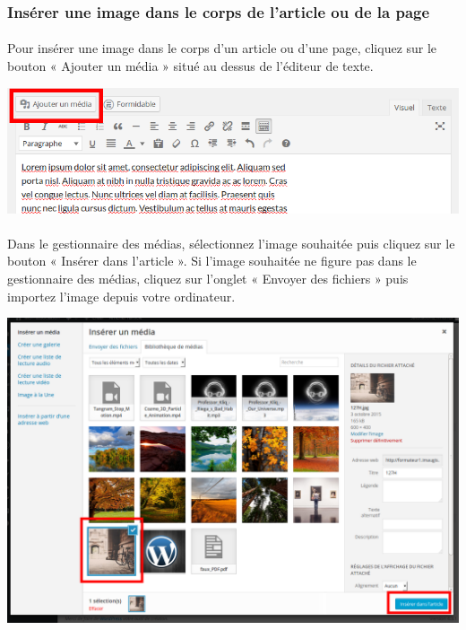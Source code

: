 \documentclass[10pt,a4paper]{article}
\begin{document}
\subsubsection{Insérer une image dans le corps de l'article ou de la page}
\paragraph{}Pour insérer une image dans le corps d'un article ou d'une page, cliquez sur le bouton « Ajouter un média » situé au dessus de l'éditeur de texte.
\begin{center}
\includegraphics[scale=0.3]{img/0102.png}
\end{center}
\paragraph{}Dans le gestionnaire des médias, sélectionnez l'image souhaitée puis cliquez sur le bouton « Insérer dans l'article ». Si l'image souhaitée ne figure pas dans le gestionnaire des médias, cliquez sur l'onglet « Envoyer des fichiers » puis importez l'image depuis votre ordinateur.
\begin{center}
\includegraphics[scale=0.25]{img/0103.png}
\end{center}
\end{document}
